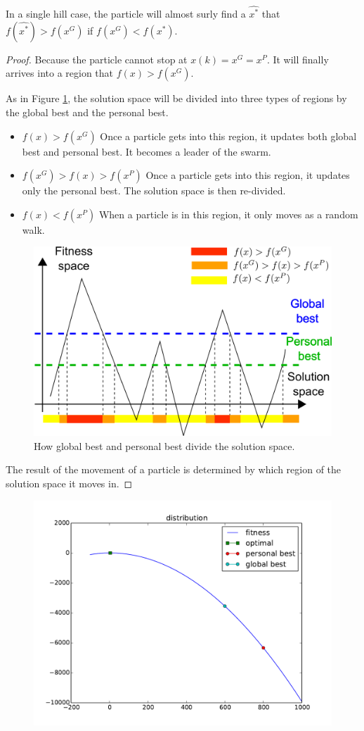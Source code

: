 \begin{mythm}
In a single hill case, the particle will almost surly find a $ \hat{x^{*}} $ that $ f(\hat{x^{*}}) > f(x^{G}) $ if $ f( x^{G} ) < f( x^{*}) $.
\begin{proof}
Because the particle cannot stop at $ x(k) = x^{G} = x^{P} $.
It will finally arrives into a region that $ f(x) > f(x^{G}) $.

As in Figure \ref{fig:categorize_regions}, the solution space will be divided into three types of regions by the global best and the personal best.
\begin{itemize}
\item $ f(x) > f(x^G) $
Once a particle gets into this region, it updates both global best and personal best. 
It becomes a leader of the swarm.
\item $ f(x^{G}) > f(x) > f(x^{P}) $
Once a particle gets into this region, it updates only the personal best.
The solution space is then re-divided.
\item $ f(x) < f(x^{P}) $
When a particle is in this region, it only moves as a random walk.
\end{itemize}

\begin{figure}
\centering
\includegraphics[width=0.7\linewidth]{./fig/categorize_regions}
\caption{How global best and personal best divide the solution space.}
\label{fig:categorize_regions}
\end{figure}

The result of the movement of a particle is determined by which region of the solution space it moves in.

\end{proof}
\end{mythm}

\begin{figure}[ht]
\centering
\includegraphics[width=.7\linewidth]{./simfig/case1/distribution1}
\label{fig:case1-1:distribution} 
\end{figure}

